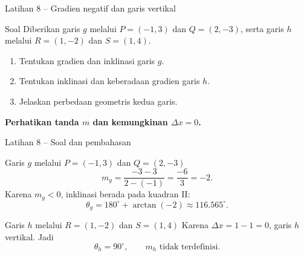 \documentclass[aspectratio=169,11pt]{beamer}
\begin{document}
\begin{frame}{Latihan 8 -- Gradien negatif dan garis vertikal}
	\begin{block}{Soal}
		Diberikan garis $g$ melalui $P=(-1,3)$ dan $Q=(2,-3)$, serta garis
		$h$ melalui $R=(1,-2)$ dan $S=(1,4)$.
		\begin{enumerate}
			\item Tentukan gradien dan inklinasi garis $g$.
			\item Tentukan inklinasi dan keberadaan gradien garis $h$.
			\item Jelaskan perbedaan geometris kedua garis.
		\end{enumerate}
	\end{block}
	
	\vspace{0.25cm}
	\centering
	\color{AcademicBlue}\bfseries Perhatikan tanda $m$ dan kemungkinan $\Delta x=0$.
\end{frame}

\begin{frame}[shrink=7]{Latihan 8 -- Soal dan pembahasan}
	\begin{exampleblock}{Garis $g$ melalui $P=(-1,3)$ dan $Q=(2,-3)$}
		\[
		m_g=\frac{-3-3}{2-(-1)}=\frac{-6}{3}=-2.
		\]
		Karena $m_g<0$, inklinasi berada pada kuadran II:
		\[
		\theta_g=180^\circ+\arctan(-2)
		\approx\boxed{116.565^\circ}.
		\]
	\end{exampleblock}
	
	\begin{exampleblock}{Garis $h$ melalui $R=(1,-2)$ dan $S=(1,4)$}
		Karena $\Delta x=1-1=0$, garis $h$ vertikal. Jadi
		\[
		\boxed{\theta_h=90^\circ},\qquad
		\boxed{m_h\text{ tidak terdefinisi}}.
		\]
	\end{exampleblock}
\end{frame}
\end{document}
